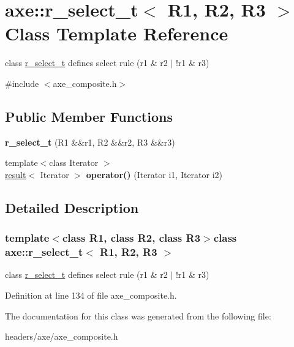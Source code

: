 \hypertarget{classaxe_1_1r__select__t}{\section{axe\+:\+:r\+\_\+select\+\_\+t$<$ R1, R2, R3 $>$ Class Template Reference}
\label{classaxe_1_1r__select__t}
}


class \hyperlink{classaxe_1_1r__select__t}{r\+\_\+select\+\_\+t} defines select rule (r1 \& r2 $\vert$ !r1 \& r3)  




{\ttfamily \#include $<$axe\+\_\+composite.\+h$>$}

\subsection*{Public Member Functions}
\begin{DoxyCompactItemize}
\item 
\hypertarget{classaxe_1_1r__select__t_a5df1de699c3c5ead7f58a9dcb3450e90}{{\bfseries r\+\_\+select\+\_\+t} (R1 \&\&r1, R2 \&\&r2, R3 \&\&r3)}\label{classaxe_1_1r__select__t_a5df1de699c3c5ead7f58a9dcb3450e90}

\item 
\hypertarget{classaxe_1_1r__select__t_a3bc2c15dd5ccc8081bcbdecc43b5676b}{{\footnotesize template$<$class Iterator $>$ }\\\hyperlink{structaxe_1_1result}{result}$<$ Iterator $>$ {\bfseries operator()} (Iterator i1, Iterator i2)}\label{classaxe_1_1r__select__t_a3bc2c15dd5ccc8081bcbdecc43b5676b}

\end{DoxyCompactItemize}


\subsection{Detailed Description}
\subsubsection*{template$<$class R1, class R2, class R3$>$class axe\+::r\+\_\+select\+\_\+t$<$ R1, R2, R3 $>$}

class \hyperlink{classaxe_1_1r__select__t}{r\+\_\+select\+\_\+t} defines select rule (r1 \& r2 $\vert$ !r1 \& r3) 

Definition at line 134 of file axe\+\_\+composite.\+h.



The documentation for this class was generated from the following file\+:\begin{DoxyCompactItemize}
\item 
headers/axe/axe\+\_\+composite.\+h\end{DoxyCompactItemize}
